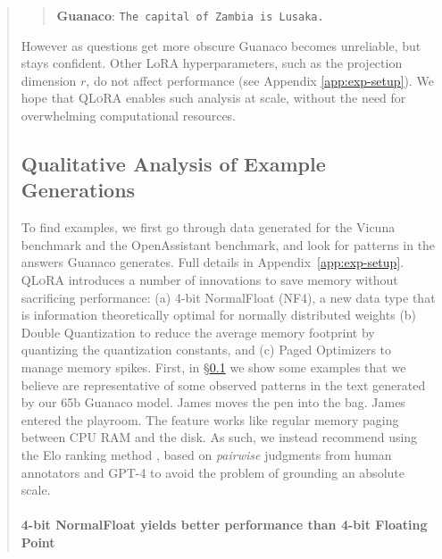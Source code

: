 \begin{quote}
{\begin{quote} 
    \textbf{Guanaco}:
    \texttt{The capital of Zambia is Lusaka.}
\end{quote}

 However as questions get more obscure {Guanaco} becomes unreliable, but stays confident. Other LoRA hyperparameters, such as the projection dimension $r$, do not affect performance (see Appendix \ref{app:exp-setup}). We hope that \textsc{QLoRA} enables such analysis at scale, without the need for overwhelming computational resources. \subsection{Qualitative Analysis of Example Generations}
\label{ssec:examples}

To find examples, we first go through data generated for the Vicuna benchmark and the OpenAssistant benchmark, and look for patterns in the answers {Guanaco} generates. Full details in Appendix~\ref{app:exp-setup}. \textsc{QLoRA} introduces a number of innovations to save memory without sacrificing performance: (a) 4-bit NormalFloat (NF4), a new data type that is information theoretically optimal for normally distributed weights (b) Double Quantization to reduce the average memory footprint by quantizing the quantization constants, and (c) Paged Optimizers to manage memory spikes. First, in \S\ref{ssec:examples} we show some examples that we believe are representative of some observed patterns in the text generated by our 65b {Guanaco} model. James moves the pen into the bag. James entered the playroom. The feature works like regular memory paging between CPU RAM and the disk. As such, we instead recommend using the Elo ranking method \citep{elo1967proposed}, based on \textit{pairwise} judgments from human annotators and GPT-4 to avoid the problem of grounding an absolute scale. \paragraph{4-bit NormalFloat yields better performance than 4-bit Floating Point} 

}
\end{quote}
